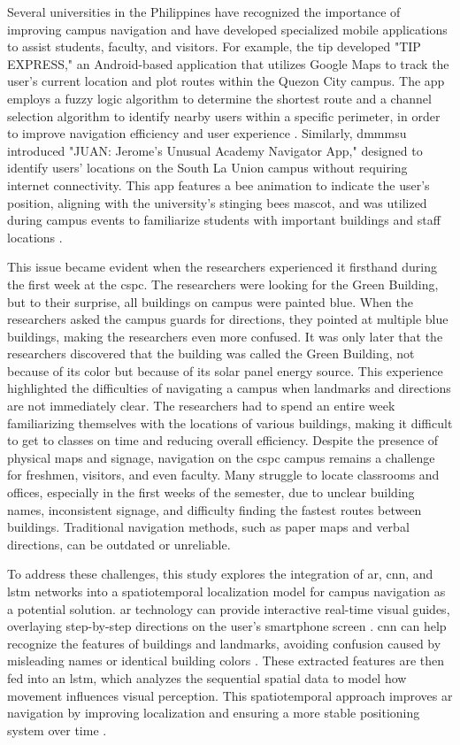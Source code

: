 \begin{refsection}
Several universities in the Philippines have recognized the importance of improving campus navigation and have developed specialized mobile applications to assist students, faculty, and visitors. For example, the \gls{tip} developed "TIP EXPRESS," an Android-based application that utilizes Google Maps to track the user's current location and plot routes within the Quezon City campus. The app employs a fuzzy logic algorithm to determine the shortest route and a channel selection algorithm to identify nearby users within a specific perimeter, in order to improve navigation efficiency and user experience \cite{5}. Similarly, \gls{dmmmsu} introduced "JUAN: Jerome's Unusual Academy Navigator App," designed to identify users' locations on the South La Union campus without requiring internet connectivity. This app features a bee animation to indicate the user's position, aligning with the university's stinging bees mascot, and was utilized during campus events to familiarize students with important buildings and staff locations \cite{6}.

This issue became evident when the researchers experienced it firsthand during the first week at the \gls{cspc}. The researchers were looking for the Green Building, but to their surprise, all buildings on campus were painted blue. When the researchers asked the campus guards for directions, they pointed at multiple blue buildings, making the researchers even more confused. It was only later that the researchers discovered that the building was called the Green Building, not because of its color but because of its solar panel energy source. This experience highlighted the difficulties of navigating a campus when landmarks and directions are not immediately clear. The researchers had to spend an entire week familiarizing themselves with the locations of various buildings, making it difficult to get to classes on time and reducing overall efficiency. Despite the presence of physical maps and signage, navigation on the \gls{cspc} campus remains a challenge for freshmen, visitors, and even faculty. Many struggle to locate classrooms and offices, especially in the first weeks of the semester, due to unclear building names, inconsistent signage, and difficulty finding the fastest routes between buildings. Traditional navigation methods, such as paper maps and verbal directions, can be outdated or unreliable.

To address these challenges, this study explores the integration of \gls{ar}, \gls{cnn}, and \gls{lstm} networks into a spatiotemporal localization model for campus navigation as a potential solution. \gls{ar} technology can provide interactive real-time visual guides, overlaying step-by-step directions on the user's smartphone screen \cite{7}. \gls{cnn} can help recognize the features of buildings and landmarks, avoiding confusion caused by misleading names or identical building colors \cite{8}. These extracted features are then fed into an \gls{lstm}, which analyzes the sequential spatial data to model how movement influences visual perception. This spatiotemporal approach improves \gls{ar} navigation by improving localization and ensuring a more stable positioning system over time \cite{8}.


\end{refsection}
